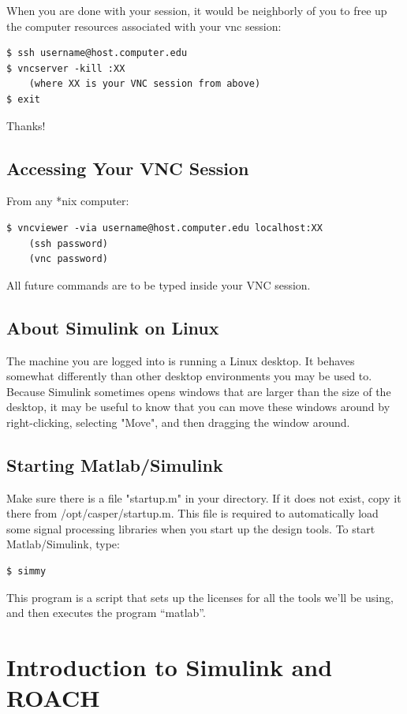 \documentclass[11pt]{article}
\begin{document}
When you are done with your session, it would be neighborly of you to free up the computer resources associated with your vnc session:
\begin{verbatim}
$ ssh username@host.computer.edu
$ vncserver -kill :XX
    (where XX is your VNC session from above)
$ exit
\end{verbatim}
Thanks!


\subsection{Accessing Your VNC Session}

From any *nix computer:
\begin{verbatim}
$ vncviewer -via username@host.computer.edu localhost:XX
    (ssh password)
    (vnc password)
\end{verbatim}

All future commands are to be typed inside your VNC session.

\subsection{About Simulink on Linux}

The machine you are logged into is running a Linux desktop.
It behaves somewhat differently than other desktop environments you may be
used to.  Because Simulink sometimes opens windows that are larger than
the size of the desktop, it may be useful to know that you can move these
windows around by right-clicking, selecting "Move", and then dragging the window around.

\subsection{Starting Matlab/Simulink}

Make sure there is a file "startup.m" in your directory.  If it does not
exist, copy it there from /opt/casper/startup.m.  This file is required to
automatically load some signal processing libraries when you start up
the design tools.  To start Matlab/Simulink, type:

\begin{verbatim}
$ simmy
\end{verbatim}

This program is a script that sets up the licenses for all the tools we'll be
using, and then executes the program ``matlab''. 

\section{Introduction to Simulink and ROACH}
\end{document}
